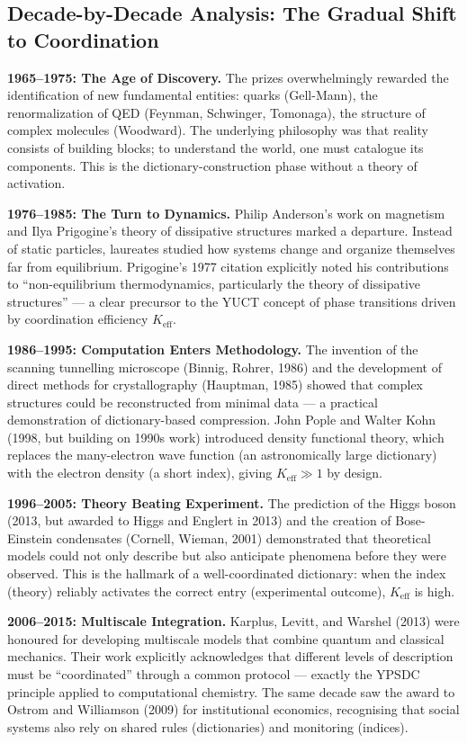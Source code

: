 \documentclass[12pt,a4paper]{article}
\begin{document}
	\subsection{Decade-by-Decade Analysis: The Gradual Shift to Coordination}
	
	\textbf{1965–1975: The Age of Discovery.} The prizes overwhelmingly rewarded the identification of new fundamental entities: quarks (Gell-Mann), the renormalization of QED (Feynman, Schwinger, Tomonaga), the structure of complex molecules (Woodward). The underlying philosophy was that reality consists of building blocks; to understand the world, one must catalogue its components. This is the dictionary-construction phase without a theory of activation.
	
	\textbf{1976–1985: The Turn to Dynamics.} Philip Anderson's work on magnetism and Ilya Prigogine's theory of dissipative structures marked a departure. Instead of static particles, laureates studied how systems change and organize themselves far from equilibrium. Prigogine's 1977 citation explicitly noted his contributions to ``non-equilibrium thermodynamics, particularly the theory of dissipative structures'' — a clear precursor to the YUCT concept of phase transitions driven by coordination efficiency \(K_{\mathrm{eff}}\).
	
	\textbf{1986–1995: Computation Enters Methodology.} The invention of the scanning tunnelling microscope (Binnig, Rohrer, 1986) and the development of direct methods for crystallography (Hauptman, 1985) showed that complex structures could be reconstructed from minimal data — a practical demonstration of dictionary-based compression. John Pople and Walter Kohn (1998, but building on 1990s work) introduced density functional theory, which replaces the many-electron wave function (an astronomically large dictionary) with the electron density (a short index), giving \(K_{\mathrm{eff}} \gg 1\) by design.
	
	\textbf{1996–2005: Theory Beating Experiment.} The prediction of the Higgs boson (2013, but awarded to Higgs and Englert in 2013) and the creation of Bose-Einstein condensates (Cornell, Wieman, 2001) demonstrated that theoretical models could not only describe but also anticipate phenomena before they were observed. This is the hallmark of a well-coordinated dictionary: when the index (theory) reliably activates the correct entry (experimental outcome), \(K_{\mathrm{eff}}\) is high.
	
	\textbf{2006–2015: Multiscale Integration.} Karplus, Levitt, and Warshel (2013) were honoured for developing multiscale models that combine quantum and classical mechanics. Their work explicitly acknowledges that different levels of description must be ``coordinated'' through a common protocol — exactly the YPSDC principle applied to computational chemistry. The same decade saw the award to Ostrom and Williamson (2009) for institutional economics, recognising that social systems also rely on shared rules (dictionaries) and monitoring (indices).
	
\end{document}
